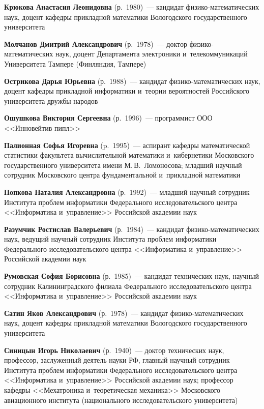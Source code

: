 \begin{multicols}{2}
\pagebreak

\noindent
\textbf{Крюкова Анастасия Леонидовна} (р.\ 1980)~--- кандидат фи\-зи\-ко-ма\-те\-ма\-ти\-че\-ских наук,
доцент ка\-фед\-ры при\-клад\-ной математики Вологодского государственного университета

\noindent
\textbf{Молчанов Дмитрий Александрович} (р.\ 1978)~--- 
доктор фи\-зи\-ко-ма\-те\-ма\-ти\-че\-ских наук, доцент Департамента электроники 
и~телекоммуникаций Университета Тампере (Финляндия, Тампере)

\def\leftkol{ОБ АВТОРАХ}
\def\rightkol{ОБ АВТОРАХ}

\noindent
\textbf{Острикова Дарья Юрьевна} (р.\ 1988)~--- 
кандидат фи\-зи\-ко-ма\-те\-ма\-ти\-че\-ских наук, доцент ка\-фед\-ры при\-клад\-ной информатики 
и~тео\-рии вероятностей Российского университета друж\-бы народов

\noindent
\textbf{Ошушкова Виктория Сергеевна} (р.\ 1996)~--- программист ООО <<Инновейтив пипл>>

\noindent
\textbf{Палионная Софья Игоревна} (p.\ 1995)~--- 
аспирант кафедры математической статистики факультета вы\-чис\-ли\-тель\-ной математики 
и~кибернетики Мос\-ков\-ско\-го государственного университета имени М.\,В.~Ломоносова; 
млад\-ший научный со\-труд\-ник Московского цент\-ра фундаментальной и~при\-клад\-ной математики

\noindent
\textbf{Попкова Наталия Александровна} (р.\ 1992)~--- 
млад\-ший научный сотрудник Института проб\-лем информатики Федерального исследовательского цент\-ра 
<<Информатика и~управ\-ле\-ние>> \mbox{Российской} академии наук

\noindent
\textbf{Разумчик Ростислав Валерьевич} (р.\ 1984)~--- 
кандидат фи\-зи\-ко-ма\-те\-ма\-ти\-че\-ских наук,
 ведущий научный сотрудник Института проб\-лем информатики Федерального исследовательского цент\-ра
 <<Информатика и~управ\-ле\-ние>> Российской академии наук


\noindent
\textbf{Румовская София Борисовна} (р.\ 1985)~--- 
кандидат технических наук, научный сотрудник Калининградского филиала Федерального исследовательского цент\-ра 
<<Информатика и~управ\-ле\-ние>> Российской академии наук



\noindent
\textbf{Сатин Яков Александрович}  (р.\ 1978)~--- 
кандидат фи\-зи\-ко-ма\-те\-ма\-ти\-че\-ских наук, 
доцент ка\-фед\-ры при\-клад\-ной математики Вологодского государственного университета

\noindent
\textbf{Синицын Игорь Николаевич} (р.\ 1940)~--- 
доктор технических наук, профессор, заслуженный деятель науки РФ,
 главный научный сотрудник Института проб\-лем информатики Федерального исследовательского цент\-ра 
 <<Информатика и~управ\-ле\-ние>> Российской академии наук; профессор ка\-фед\-ры 
 <<Мехатроника и~тео\-ре\-ти\-че\-ская механика>> Московского авиационного института 
 (национального исследовательского университета)


\end{multicols}
